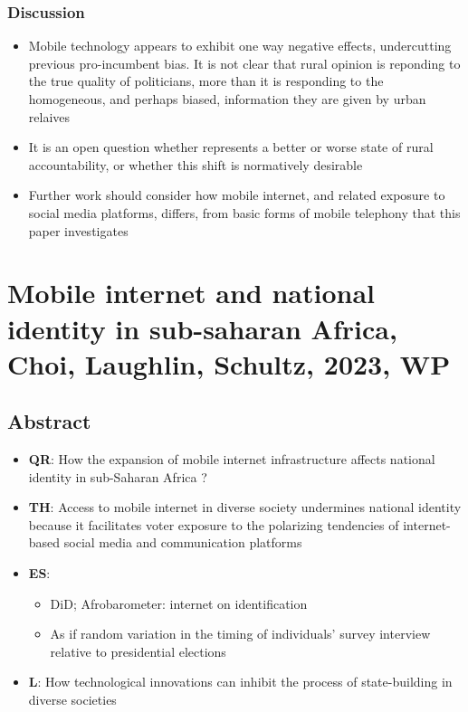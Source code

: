 \documentclass[11pt]{article}
\begin{document}
\subsubsection*{Discussion}
\begin{itemize}
    \item Mobile technology appears to exhibit one way negative effects, undercutting previous pro-incumbent bias. It is not clear that rural opinion is reponding to the true quality of politicians, more than it is responding to the homogeneous, and perhaps biased, information they are given by urban relaives
    \item It is an open question whether represents a better or worse state of rural accountability, or whether this shift is normatively desirable
    \item Further work should consider how mobile internet, and related exposure to social media platforms, differs, from basic forms of mobile telephony that this paper investigates
\end{itemize}
\clearpage
\section{Mobile internet and national identity in sub-saharan Africa, Choi, Laughlin, Schultz, 2023, WP}

\subsection{Abstract}
\begin{itemize}
    \item \textbf{QR}: How the expansion of mobile internet infrastructure affects national identity in sub-Saharan Africa ?
    \item \textbf{TH}: Access to mobile internet in diverse society undermines national identity because it facilitates voter exposure to the polarizing tendencies of internet-based social media and communication platforms
    \item \textbf{ES}: \begin{itemize}
        \item DiD; Afrobarometer: internet on identification
        \item As if random variation in the timing of individuals' survey interview relative to presidential elections
    \end{itemize}
    \item \textbf{L}: How technological innovations can inhibit the process of state-building in diverse societies
\end{itemize}
\end{document}
